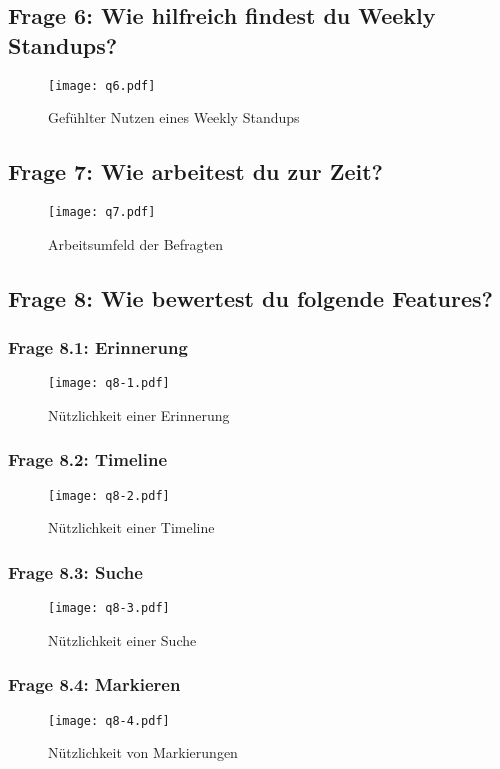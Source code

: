 \subsection{Frage 6: Wie hilfreich findest du Weekly Standups?}
\begin{figure}[H]
	\centering
	\texttt{[image: q6.pdf]}
    \caption{Gefühlter Nutzen eines Weekly Standups}
	\label{fig:q6}
\end{figure}  
\subsection{Frage 7: Wie arbeitest du zur Zeit?}
\begin{figure}[H]
	\centering
	\texttt{[image: q7.pdf]}
    \caption{Arbeitsumfeld der Befragten}
	\label{fig:q7}
\end{figure}  
\subsection{Frage 8: Wie bewertest du folgende Features?}
\subsubsection{Frage 8.1: Erinnerung}
\begin{figure}[H]
	\centering
	\texttt{[image: q8-1.pdf]}
    \caption{Nützlichkeit einer Erinnerung}
	\label{fig:q81}
\end{figure} 
\subsubsection{Frage 8.2: Timeline}
\begin{figure}[H]
	\centering
	\texttt{[image: q8-2.pdf]}
    \caption{Nützlichkeit einer Timeline}
	\label{fig:q82}
\end{figure} 
\subsubsection{Frage 8.3: Suche}
\begin{figure}[H]
	\centering
	\texttt{[image: q8-3.pdf]}
    \caption{Nützlichkeit einer Suche}
	\label{fig:q83}
\end{figure} 
\subsubsection{Frage 8.4: Markieren}
\begin{figure}[H]
	\centering
	\texttt{[image: q8-4.pdf]}
    \caption{Nützlichkeit von Markierungen}
	\label{fig:q84}
\end{figure} 
